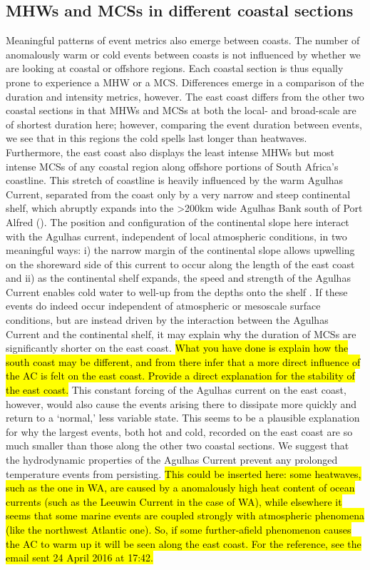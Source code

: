 \documentclass[a4paper,10pt,review]{elsarticle}
\begin{document}
\subsection{MHWs and MCSs in different coastal sections}
Meaningful patterns of event metrics also emerge between coasts. The number of anomalously warm or cold events between coasts is not influenced by whether we are looking at coastal or offshore regions. Each coastal section is thus equally prone to experience a MHW or a MCS. Differences emerge in a comparison of the duration and intensity metrics, however. The east coast differs from the other two coastal sections in that MHWs and MCSs at both the local- and broad-scale are of shortest duration here; however, comparing the event duration between events, we see that in this regions the cold spells last longer than heatwaves. Furthermore, the east coast also displays the least intense MHWs but most intense MCSs of any coastal region along offshore portions of South Africa's coastline. This stretch of coastline is heavily influenced by the warm Agulhas Current, separated from the coast only by a very narrow and steep continental shelf, which abruptly expands into the >200km wide Agulhas Bank south of Port Alfred (). The position and configuration of the continental slope here interact with the Agulhas current, independent of local atmospheric conditions, in two meaningful ways: i) the narrow margin of the continental slope allows upwelling on the shoreward side of this current to occur along the length of the east coast and ii) as the continental shelf expands, the speed and strength of the Agulhas Current enables cold water to well-up from the depths onto the shelf \citep{Lutjeharms2000}. If these events do indeed occur independent of atmospheric or mesoscale surface conditions, but are instead driven by the interaction between the Agulhas Current and the continental shelf, it may explain why the duration of MCSs are significantly shorter on the east coast. \hl{What you have done is explain how the south coast may be different, and from there infer that a more direct influence of the AC is felt on the east coast. Provide a direct explanation for the stability of the east coast.} This constant forcing of the Agulhas current on the east coast, however, would also cause the events arising there to dissipate more quickly and return to a `normal,' less variable state. This seems to be a plausible explanation for why the largest events, both hot and cold, recorded on the east coast are so much smaller than those along the other two coastal sections. We suggest that the hydrodynamic properties of the Agulhas Current prevent any prolonged temperature events from persisting. \hl{This could be inserted here: some heatwaves, such as the one in WA, are caused by a anomalously high heat content of ocean currents (such as the Leeuwin Current in the case of WA), while elsewhere it seems that some marine events are coupled strongly with atmospheric phenomena (like the northwest Atlantic one). So, if some further-afield phenomenon causes the AC to warm up it will be seen along the east coast. For the reference, see the email sent 24 April 2016 at 17:42.}
\end{document}
